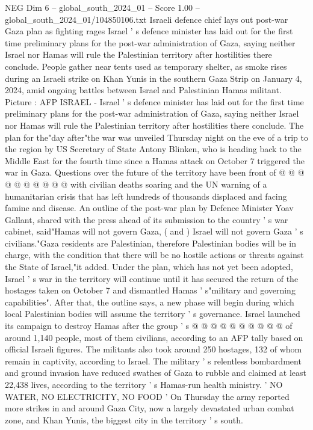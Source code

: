 \begin{textsample}{NEG Dim 6 – global\_south\_2024\_01 – Score 1.00 – global\_south\_2024\_01/104850106.txt}  \label{ex:f6_neg_354}
Israeli defence chief lays out post-war Gaza plan as fighting rages Israel ' s defence minister has laid out for the first time preliminary plans for the post-war administration of Gaza, saying neither Israel nor Hamas will rule the Palestinian territory after hostilities there conclude.
People gather near tents used as temporary shelter, as smoke rises during an Israeli strike on Khan Yunis in the southern Gaza Strip on January 4, 2024, amid ongoing battles between Israel and Palestinian Hamas militant.
Picture : AFP ISRAEL - Israel ' s defence minister has laid out for the first time preliminary plans for the post-war administration of Gaza, saying neither Israel nor Hamas will rule the Palestinian territory after hostilities there conclude.
The plan for the"day after"the war was unveiled Thursday night on the eve of a trip to the region by US Secretary of State Antony Blinken, who is heading back to the Middle East for the fourth time since a Hamas attack on October 7 triggered the war in Gaza.
Questions over the future of the territory have been front of @ @ @ @ @ @ @ @ @ @ with civilian deaths soaring and the UN warning of a humanitarian crisis that has left hundreds of thousands displaced and facing famine and disease.
An outline of the post-war plan by Defence Minister Yoav Gallant, shared with the press ahead of its submission to the country ' s war cabinet, said"Hamas will not govern Gaza, ( and ) Israel will not govern Gaza ' s civilians."Gaza residents are Palestinian, therefore Palestinian bodies will be in charge, with the condition that there will be no hostile actions or threats against the State of Israel,"it added.
Under the plan, which has not yet been adopted, Israel ' s war in the territory will continue until it has secured the return of the hostages taken on October 7 and dismantled Hamas ' s"military and governing capabilities".
After that, the outline says, a new phase will begin during which local Palestinian bodies will assume the territory ' s governance.
Israel launched its campaign to destroy Hamas after the group ' s @ @ @ @ @ @ @ @ @ @ of around 1,140 people, most of them civilians, according to an AFP tally based on official Israeli figures.
The militants also took around 250 hostages, 132 of whom remain in captivity, according to Israel.
The military ' s relentless bombardment and ground invasion have reduced swathes of Gaza to rubble and claimed at least 22,438 lives, according to the territory ' s Hamas-run health ministry. ' NO WATER, NO ELECTRICITY, NO FOOD ' On Thursday the army reported more strikes in and around Gaza City, now a largely devastated urban combat zone, and Khan Yunis, the biggest city in the territory ' s south.

\end{textsample}
